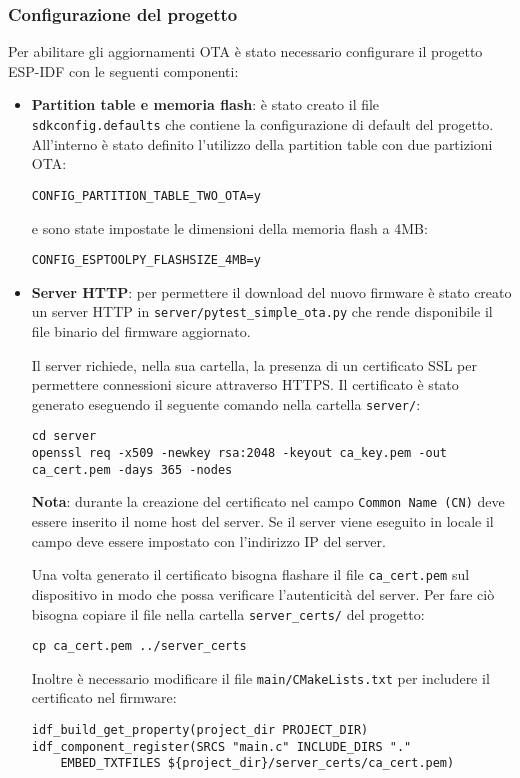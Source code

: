 \documentclass[a4paper]{article}
\begin{document}
\subsubsection{Configurazione del progetto}
Per abilitare gli aggiornamenti OTA è stato necessario configurare il progetto ESP-IDF
con le seguenti componenti:
\begin{itemize}
  \item \textbf{Partition table e memoria flash}: è stato creato il file\\
    \texttt{sdkconfig.defaults}
    che contiene la configurazione di default del progetto. All'interno è stato
    definito l'utilizzo della partition table con due partizioni OTA:
\begin{lstlisting}
CONFIG_PARTITION_TABLE_TWO_OTA=y
\end{lstlisting}
    e sono state impostate le dimensioni della memoria flash a 4MB:
\begin{lstlisting}
CONFIG_ESPTOOLPY_FLASHSIZE_4MB=y
\end{lstlisting}

  \item \textbf{Server HTTP}: per permettere il download del nuovo firmware è stato
    creato un server HTTP in \texttt{server/pytest\_simple\_ota.py} che rende
    disponibile il file binario del firmware aggiornato.

    Il server richiede, nella sua cartella, la presenza di un certificato SSL per
    permettere connessioni sicure attraverso HTTPS. Il certificato è stato generato
    eseguendo il seguente comando nella cartella \texttt{server/}:
\begin{lstlisting}
cd server
openssl req -x509 -newkey rsa:2048 -keyout ca_key.pem -out ca_cert.pem -days 365 -nodes
\end{lstlisting}
    \textbf{Nota}: durante la creazione del certificato nel campo \texttt{Common Name (CN)}
    deve essere inserito il nome host del server. Se il server viene eseguito in locale
    il campo deve essere impostato con l'indirizzo IP del server.

    Una volta generato il certificato bisogna flashare il file \texttt{ca\_cert.pem}
    sul dispositivo in modo che possa verificare l'autenticità del server.
    Per fare ciò bisogna copiare il file nella cartella \texttt{server\_certs/} del
    progetto:
\begin{lstlisting}
cp ca_cert.pem ../server_certs
\end{lstlisting}
    Inoltre è necessario modificare il file \texttt{main/CMakeLists.txt} per includere
    il certificato nel firmware:
\begin{lstlisting}
idf_build_get_property(project_dir PROJECT_DIR)
idf_component_register(SRCS "main.c" INCLUDE_DIRS "."
    EMBED_TXTFILES ${project_dir}/server_certs/ca_cert.pem)
\end{lstlisting}


\end{itemize}
\end{document}
